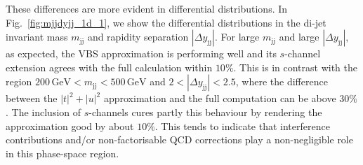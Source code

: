 \documentclass[twocolumn,epjc3]{svjour3} %
\newcommand{\Pj}{\ensuremath{\text{j}}\xspace}
\newcommand{\GeV}{\ensuremath{\,\text{GeV}}\xspace}
\begin{document}
    These differences are more evident in differential distributions.
    In Fig.~\ref{fig:mjjdyjj_1d_1}, we show the differential distributions in the di-jet invariant mass $m_{\Pj\Pj}$ and rapidity separation $|\Delta y_{\Pj\Pj}|$.
    For large $m_{\Pj\Pj}$ and large $|\Delta y_{\Pj\Pj}|$, as expected, the VBS approximation is performing well and its $s$-channel extension agrees with the full calculation within $10\%$.
    This is in contrast with the region  $200 \GeV < m_{\Pj\Pj} < 500 \GeV$ and $2<|\Delta y_{\Pj\Pj}|<2.5$, where
    the difference between the $|t|^2+|u|^2$ approximation and the full computation can be above $30\%$.
    The inclusion of $s$-channels cures partly this behaviour by rendering the approximation good by about $10\%$.
    This tends to indicate that interference contributions and/or non-factorisable QCD corrections play a non-negligible role in this phase-space region.
\end{document}

